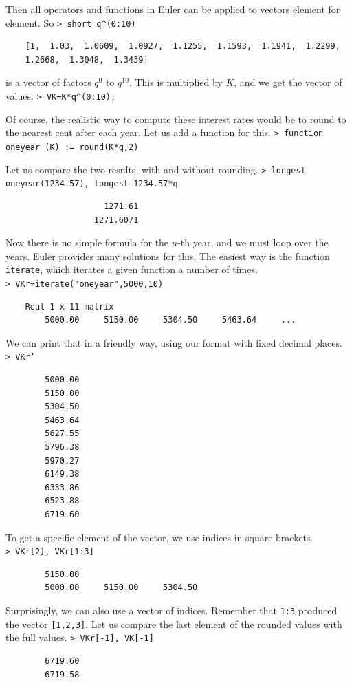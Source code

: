 \documentclass[11pt, a4paper]{article}
\newcommand{\emtcmd}[1]{\noindent\texttt{\textcolor{emtcommand}{>}\ #1}\par\smallskip}
\begin{document}
Then all operators and functions in Euler can be applied to vectors element for element. So
\emtcmd{short q\^{}(0:10)}
\begin{verbatim}
    [1,  1.03,  1.0609,  1.0927,  1.1255,  1.1593,  1.1941,  1.2299,
    1.2668,  1.3048,  1.3439]
\end{verbatim}
is a vector of factors $q^0$ to $q^{10}$. This is multiplied by $K$, and we get the vector of values.
\emtcmd{VK=K*q\^{}(0:10);}

Of course, the realistic way to compute these interest rates would be to round to the nearest cent after each year. Let us add a function for this.
\emtcmd{function oneyear (K) := round(K*q,2)}

Let us compare the two results, with and without rounding.
\emtcmd{longest oneyear(1234.57), longest 1234.57*q}
\begin{verbatim}
                    1271.61
                  1271.6071
\end{verbatim}

Now there is no simple formula for the $n$-th year, and we must loop over the years. Euler provides many solutions for this. The easiest way is the function \texttt{iterate}, which iterates a given function a number of times.
\emtcmd{VKr=iterate("oneyear",5000,10)}
\begin{verbatim}
    Real 1 x 11 matrix
        5000.00     5150.00     5304.50     5463.64     ...
\end{verbatim}

We can print that in a friendly way, using our format with fixed decimal places.
\emtcmd{VKr'}
\begin{verbatim}
        5000.00
        5150.00
        5304.50
        5463.64
        5627.55
        5796.38
        5970.27
        6149.38
        6333.86
        6523.88
        6719.60
\end{verbatim}

To get a specific element of the vector, we use indices in square brackets.
\emtcmd{VKr[2], VKr[1:3]}
\begin{verbatim}
        5150.00
        5000.00     5150.00     5304.50
\end{verbatim}

Surprisingly, we can also use a vector of indices. Remember that \texttt{1:3} produced the vector \texttt{[1,2,3]}. Let us compare the last element of the rounded values with the full values.
\emtcmd{VKr[-1], VK[-1]}
\begin{verbatim}
        6719.60
        6719.58
\end{verbatim}
\end{document}
